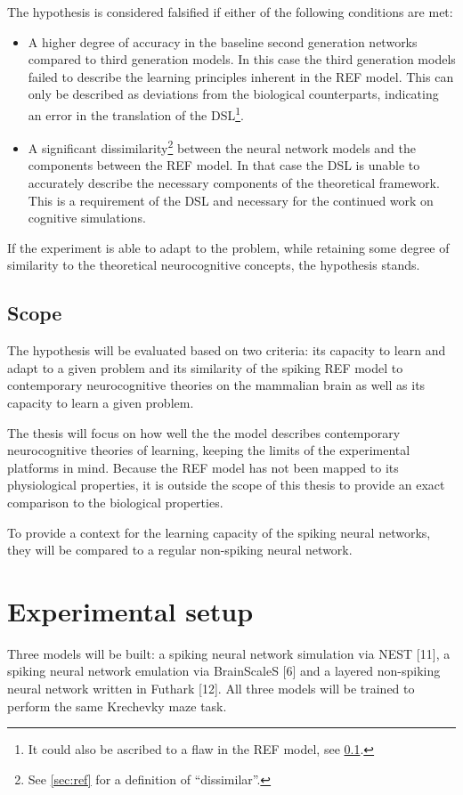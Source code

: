 \documentclass[report.tex]{subfiles}
\begin{document}
The hypothesis is considered falsified if either of the following 
conditions are met: 
\begin{itemize}
  \item A higher degree of accuracy in the baseline second generation
    networks compared to third generation models.
    In this case the third generation models failed to describe the
    learning principles inherent in the \gls{REF} model.
    This can only be described as deviations from the biological
    counterparts, indicating an error in the translation of the
    \gls{DSL}\footnote{It could also be ascribed to a flaw in the 
    \gls{REF} model, see \ref{sec:scope}.}.
  \item A significant dissimilarity\footnote{See \ref{sec:ref} for 
    a definition of ``dissimilar''.} between the neural network models
    and the components between the \gls{REF} model. 
    In that case the \gls{DSL} is unable to accurately describe the
    necessary components of the theoretical framework.
    This is a requirement of the \gls{DSL} and necessary for the 
    continued work on cognitive simulations.
\end{itemize}

If the experiment is able to adapt to the problem, while retaining some
degree of similarity to the theoretical neurocognitive concepts, 
the hypothesis stands.

\subsection{Scope} \label{sec:scope}
The hypothesis will be evaluated based on two criteria: its 
capacity to learn and adapt to a given problem and its similarity of
the spiking REF model to contemporary neurocognitive theories on the
mammalian brain as well as its capacity to learn a given problem.

The thesis will focus on how well the the model describes contemporary
neurocognitive theories of learning, keeping the limits of the
experimental platforms in mind.
Because the REF model has not been mapped to its physiological
properties, it is outside the scope of this thesis to provide an exact
comparison to the biological properties.

To provide a context for the learning capacity of the spiking neural networks, they will be compared to a regular non-spiking neural network.

\section{Experimental setup}
Three models will be built: a spiking neural network simulation via NEST [11], a spiking neural network emulation via BrainScaleS [6] and a layered non-spiking neural network written in Futhark [12].
All three models will be trained to perform the same Krechevky maze task.
\end{document}
